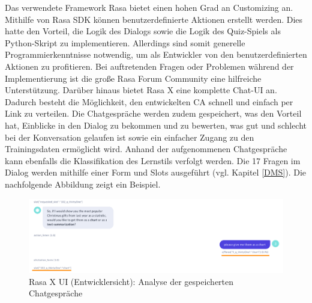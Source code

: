 Das verwendete Framework Rasa bietet einen hohen Grad an Customizing an.
Mithilfe von Rasa SDK können benutzerdefinierte Aktionen erstellt werden.
Dies hatte den Vorteil, die Logik des Dialogs sowie die Logik des Quiz-Spiels als Python-Skript zu implementieren.
Allerdings sind somit generelle Programmierkenntnisse notwendig, um als Entwickler von den benutzerdefinierten Aktionen
zu profitieren.
Bei auftretenden Fragen oder Problemen während der Implementierung ist die große Rasa Forum Community eine hilfreiche Unterstützung. 
Darüber hinaus bietet Rasa X eine komplette Chat-UI an. 
Dadurch besteht die Möglichkeit, den entwickelten CA schnell und einfach per Link zu verteilen.
Die Chatgespräche werden zudem gespeichert, was den Vorteil hat, Einblicke in den Dialog zu bekommen und zu bewerten, 
was gut und schlecht bei der Konversation gelaufen ist sowie ein einfacher Zugang zu den Trainingsdaten ermöglicht wird. 
Anhand der aufgenommenen Chatgespräche kann ebenfalls die Klassifikation des Lernstils verfolgt werden.
Die 17 Fragen im Dialog werden mithilfe einer Form und Slots ausgeführt (vgl. Kapitel \ref{DMS}).
Die nachfolgende Abbildung zeigt ein Beispiel.
\begin{figure}[H]
    \centering
    \includegraphics[width=1\linewidth]{images//validateData.png}
   \caption[Rasa X UI (Entwicklersicht): Analyse der gespeicherten Chatgespräche] {Rasa X UI (Entwicklersicht): Analyse der gespeicherten Chatgespräche}
  \label{fig:intentvalidation}
  \end{figure} 


